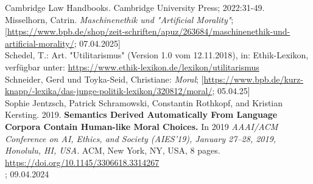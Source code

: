 Cambridge Law Handbooks.
Cambridge University Press; 2022:31-49. \\
\newline
Misselhorn, Catrin.
\textit{Maschinenethik und "Artificial Morality"};
[\href{https://www.bpb.de/shop/zeitschriften/apuz/263684/maschinenethik-und-artificial-morality/}{https://www.bpb.de/shop/zeit-schriften/apuz/263684/maschinenethik-und-artificial-morality/};
07.04.2025] \\
\newline
Schedel, T.: Art.
"Utilitarismus" (Version 1.0 vom 12.11.2018), in: Ethik-Lexikon, verfügbar
unter: \href{https://www.ethik-lexikon.de/lexikon/utilitarismus}{https://www.ethik-lexikon.de/lexikon/utilitarismus} \\
\newline
Schneider, Gerd und Toyka-Seid, Christiane:
\textit{Moral};
[\href{https://www.bpb.de/kurz-knapp/lexika/das-junge-politik-lexikon/320812/moral/}{https://www.bpb.de/kurz-knapp/-lexika/das-junge-politik-lexikon/320812/moral/};
05.04.25] \\
\newline
Sophie Jentzsch, Patrick Schramowski, Constantin Rothkopf, and Kristian
Kersting. 2019.
\textbf{Semantics Derived Automatically From Language Corpora
Contain Human-like Moral Choices.}
In 2019 \textit{AAAI/ACM Conference on AI,
Ethics, and Society (AIES’19), January 27–28, 2019, Honolulu, HI, USA.} ACM,
New York, NY, USA, 8 pages. \\
\href{https://doi.org/10.1145/3306618.3314267}{https://doi.org/10.1145/3306618.3314267} \\
; 09.04.2024 \\







